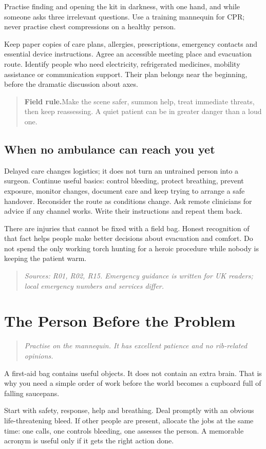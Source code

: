 \documentclass[10pt,openright]{book}
\newcommand{\fieldrule}[1]{\begin{quote}\textbf{Field rule.}\enspace #1\end{quote}}
\begin{document}
Practise finding and opening the kit in darkness, with one hand, and while someone asks three irrelevant questions. Use a training mannequin for CPR; never practise chest compressions on a healthy person.

Keep paper copies of care plans, allergies, prescriptions, emergency contacts and essential device instructions. Agree an accessible meeting place and evacuation route. Identify people who need electricity, refrigerated medicines, mobility assistance or communication support. Their plan belongs near the beginning, before the dramatic discussion about axes.

\fieldrule{Make the scene safer, summon help, treat immediate threats, then keep reassessing. A quiet patient can be in greater danger than a loud one.}
\section*{When no ambulance can reach you yet}
Delayed care changes logistics; it does not turn an untrained person into a surgeon. Continue useful basics: control bleeding, protect breathing, prevent exposure, monitor changes, document care and keep trying to arrange a safe handover. Reconsider the route as conditions change. Ask remote clinicians for advice if any channel works. Write their instructions and repeat them back.

There are injuries that cannot be fixed with a field bag. Honest recognition of that fact helps people make better decisions about evacuation and comfort. Do not spend the only working torch hunting for a heroic procedure while nobody is keeping the patient warm.

\begin{quote}\emph{Sources: R01, R02, R15. Emergency guidance is written for UK readers; local emergency numbers and services differ.}\end{quote}
\chapter{The Person Before the Problem}
\begin{quote}\emph{Practise on the mannequin. It has excellent patience and no rib-related opinions.}\end{quote}
A first-aid bag contains useful objects. It does not contain an extra brain. That is why you need a simple order of work before the world becomes a cupboard full of falling saucepans.

Start with safety, response, help and breathing. Deal promptly with an obvious life-threatening bleed. If other people are present, allocate the jobs at the same time: one calls, one controls bleeding, one assesses the person. A memorable acronym is useful only if it gets the right action done.
\end{document}
